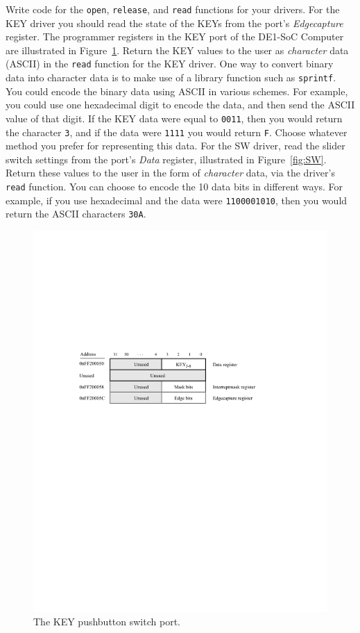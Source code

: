\documentclass[epsfig,10pt,fullpage]{article}
\begin{document}
\begin{enumerate}
\noindent
Write code for the \texttt{open}, \texttt{release}, and \texttt{read} functions for your drivers.
For the KEY driver you should read the state of the KEYs from the port's {\it Edgecapture} register.
The programmer registers in the KEY port of the DE1-SoC Computer are illustrated in
Figure~\ref{fig:KEY}. Return the KEY values to the user as {\it character} data (ASCII) in 
the \texttt{read} function for the KEY driver. One way to convert binary data into character 
data is to make use of a library function such as \texttt{sprintf}. You could encode the
binary data using ASCII in various schemes. For example, you could use one hexadecimal digit
to encode the data, and then send the ASCII value of that digit. If the KEY data were equal 
to \texttt{0011}, then you would return the character \texttt{3}, and if the data 
were \texttt{1111} you would return \texttt{F}. Choose whatever method you prefer for 
representing this data. For the SW driver, read the slider switch settings from the 
port's {\it Data} register, illustrated in Figure~\ref{fig:SW}. Return these values to the 
user in the form of {\it character} data, via the driver's \texttt{read} function. You can
choose to encode the 10 data bits in different ways. For example, if you use hexadecimal
and the data were \texttt{1100001010}, then you would return the ASCII characters
\texttt{30A}.

\begin{figure}[H]
   \begin{center}
       \includegraphics{figures/figureKEY.pdf}
   \end{center}
	\caption{The KEY pushbutton switch port.}
\label{fig:KEY}
\end{figure}


\end{enumerate}
\end{document}
